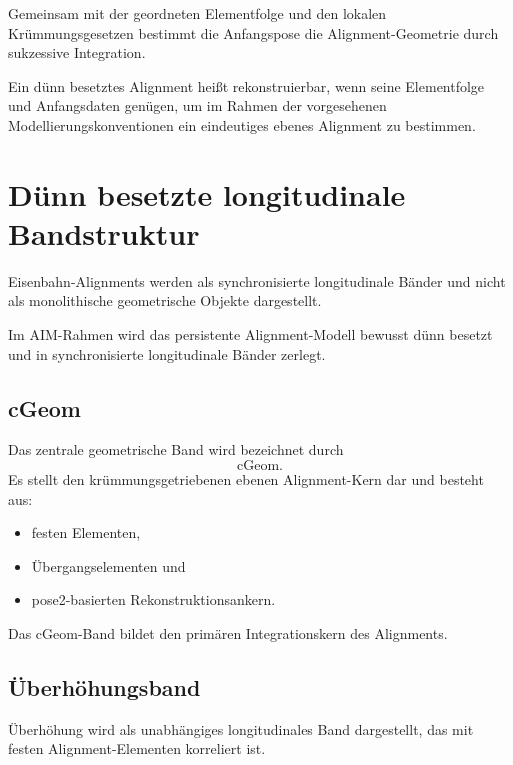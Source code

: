Gemeinsam mit der geordneten Elementfolge und den lokalen Krümmungsgesetzen
bestimmt die Anfangspose die Alignment-Geometrie durch sukzessive Integration.

\begin{definition}
Ein dünn besetztes Alignment heißt rekonstruierbar, wenn seine Elementfolge
und Anfangsdaten genügen, um im Rahmen der vorgesehenen
Modellierungskonventionen ein eindeutiges ebenes Alignment zu bestimmen.
\end{definition}

\section{Dünn besetzte longitudinale Bandstruktur}

\begin{principle}
Eisenbahn-Alignments werden als synchronisierte longitudinale Bänder und nicht
als monolithische geometrische Objekte dargestellt.
\end{principle}

Im AIM-Rahmen wird das persistente Alignment-Modell bewusst dünn besetzt und
in synchronisierte longitudinale Bänder zerlegt.

\subsection{cGeom}

\begin{definition}
Das zentrale geometrische Band wird bezeichnet durch
\[
\mathrm{cGeom}.
\]
Es stellt den krümmungsgetriebenen ebenen Alignment-Kern dar und besteht aus:
\begin{itemize}
\item festen Elementen,
\item Übergangselementen und
\item pose2-basierten Rekonstruktionsankern.
\end{itemize}
\end{definition}

Das cGeom-Band bildet den primären Integrationskern des Alignments.

\subsection{Überhöhungsband}

\begin{definition}[Überhöhungsband]
Überhöhung wird als unabhängiges longitudinales Band dargestellt, das mit
festen Alignment-Elementen korreliert ist.
\end{definition}

